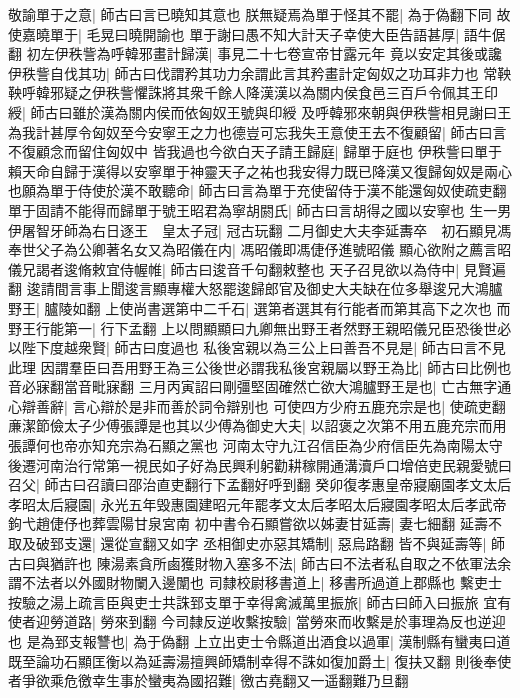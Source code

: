敬諭單于之意|{
	師古曰言已曉知其意也}
朕無疑焉為單于怪其不罷|{
	為于偽翻下同}
故使嘉曉單于|{
	毛晃曰曉開諭也}
單于謝曰愚不知大計天子幸使大臣告語甚厚|{
	語牛倨翻}
初左伊秩訾為呼韓邪畫計歸漢|{
	事見二十七卷宣帝甘露元年}
竟以安定其後或讒伊秩訾自伐其功|{
	師古曰伐謂矜其功力余謂此言其矜畫計定匈奴之功耳非力也}
常鞅鞅呼韓邪疑之伊秩訾懼誅將其衆千餘人降漢漢以為關内侯食邑三百戶令佩其王印綬|{
	師古曰雖於漢為關内侯而依匈奴王號與印綬}
及呼韓邪來朝與伊秩訾相見謝曰王為我計甚厚令匈奴至今安寧王之力也德豈可忘我失王意使王去不復顧留|{
	師古曰言不復顧念而留住匈奴中}
皆我過也今欲白天子請王歸庭|{
	歸單于庭也}
伊秩訾曰單于賴天命自歸于漢得以安寧單于神靈天子之祐也我安得力既已降漢又復歸匈奴是兩心也願為單于侍使於漢不敢聽命|{
	師古曰言為單于充使留侍于漢不能還匈奴使疏吏翻}
單于固請不能得而歸單于號王昭君為寧胡閼氏|{
	師古曰言胡得之國以安寧也}
生一男伊屠智牙師為右日逐王　皇太子冠|{
	冠古玩翻}
二月御史大夫李延夀卒　初石顯見馮奉世父子為公卿著名女又為昭儀在内|{
	馮昭儀即馮倢伃進號昭儀}
顯心欲附之薦言昭儀兄謁者逡脩敕宜侍幄帷|{
	師古曰逡音千句翻敕整也}
天子召見欲以為侍中|{
	見賢遍翻}
逡請間言事上聞逡言顯專權大怒罷逡歸郎官及御史大夫缺在位多舉逡兄大鴻臚野王|{
	臚陵如翻}
上使尚書選第中二千石|{
	選第者選其有行能者而第其高下之次也}
而野王行能第一|{
	行下孟翻}
上以問顯顯曰九卿無出野王者然野王親昭儀兄臣恐後世必以陛下度越衆賢|{
	師古曰度過也}
私後宮親以為三公上曰善吾不見是|{
	師古曰言不見此理}
因謂羣臣曰吾用野王為三公後世必謂我私後宮親屬以野王為比|{
	師古曰比例也音必寐翻當音毗寐翻}
三月丙寅詔曰剛彊堅固確然亡欲大鴻臚野王是也|{
	亡古無字通}
心辯善辭|{
	言心辯於是非而善於詞令辯别也}
可使四方少府五鹿充宗是也|{
	使疏吏翻}
亷潔節儉太子少傅張譚是也其以少傅為御史大夫|{
	以詔褒之次第不用五鹿充宗而用張譚何也帝亦知充宗為石顯之黨也}
河南太守九江召信臣為少府信臣先為南陽太守後遷河南治行常第一視民如子好為民興利躬勸耕稼開通溝瀆戶口增倍吏民親愛號曰召父|{
	師古曰召讀曰邵治直吏翻行下孟翻好呼到翻}
癸卯復孝惠皇帝寢廟園孝文太后孝昭太后寢園|{
	永光五年毁惠園建昭元年罷孝文太后孝昭太后寢園孝昭太后孝武帝鉤弋趙倢伃也葬雲陽甘泉宮南}
初中書令石顯嘗欲以姊妻甘延壽|{
	妻七細翻}
延壽不取及破郅支還|{
	還從宣翻又如字}
丞相御史亦惡其矯制|{
	惡烏路翻}
皆不與延壽等|{
	師古曰與猶許也}
陳湯素貪所鹵獲財物入塞多不法|{
	師古曰不法者私自取之不依軍法余謂不法者以外國財物闌入邊闈也}
司隸校尉移書道上|{
	移書所過道上郡縣也}
繫吏士按驗之湯上疏言臣與吏士共誅郅支單于幸得禽滅萬里振旅|{
	師古曰師入曰振旅}
宜有使者迎勞道路|{
	勞來到翻}
今司隸反逆收繫按驗|{
	當勞來而收繫是於事理為反也逆迎也}
是為郅支報讐也|{
	為于偽翻}
上立出吏士令縣道出酒食以過軍|{
	漢制縣有蠻夷曰道}
既至論功石顯匡衡以為延壽湯擅興師矯制幸得不誅如復加爵土|{
	復扶又翻}
則後奉使者爭欲乘危徼幸生事於蠻夷為國招難|{
	徼古堯翻又一遥翻難乃旦翻}
